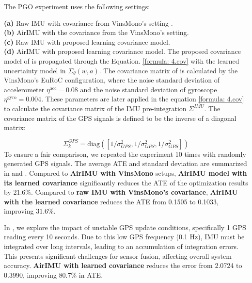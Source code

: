 The PGO experiment uses the following settings:

\noindent\textbf{(a)} Raw IMU with covariance from VinsMono's setting \cite{qin2018vins}. \label{PGO: a}\\
\textbf{(b)} AirIMU with the covariance from the VinsMono's setting.\label{PGO: b}\\
\textbf{(c)} Raw IMU with proposed learning covariance model.\label{PGO: c}\\
\textbf{(d)} AirIMU with proposed learning covariance model.\label{PGO: d}
The proposed covariance model of \textbf{{}} is propagated through the Equation. \ref{formula: 4.cov} with the learned uncertainty model in $\Sigma_\theta(w,a)$. 
The covariance matrix of \textbf{{}} is calculated by the VinsMono's EuRoC configuration, where the noise standard deviation of accelerometer $\eta^{\text{acc}} = 0.08$ and the noise standard deviation of gyroscope $\eta^{\text{gyro}} = 0.004$.
These parameters are later applied in the equation \ref{formula: 4.cov} to calculate the covariance matrix of the IMU pre-integration $\Sigma^{IMU}$.
The covariance matrix of the GPS signals is defined to be the inverse of a diagonal matrix: 

$$\Sigma_k^{GPS} = \mathrm{diag}([1/\sigma^2_{GPS}, 1/\sigma^2_{GPS}, 1/\sigma^2_{GPS}])$$
To ensure a fair comparison, we repeated the experiment 10 times with randomly generated GPS signals.
The average ATE and standard deviation are summarized in  and .
Compared to \textbf{{} AirIMU with VinsMono}  setups, \textbf{{} AirIMU model with its learned covariance} significantly reduces the ATE of the optimization results by 21.6\%. 
Compared to \textbf{ raw IMU with VinsMono's covariance}, \textbf{ AirIMU with the learned covariance} reduces the ATE from 0.1505 to 0.1033, improving 31.6$\%$.

In , we explore the impact of unstable GPS update conditions, specifically 1 GPS reading every 10 seconds. 
Due to this low GPS frequency (0.1 Hz), IMU must be integrated over long intervals, leading to an accumulation of integration errors. 
This presents significant challenges for sensor fusion, affecting overall system accuracy.
\textbf{ AirIMU with learned covariance} reduces the error from 2.0724 to 0.3990, improving 80.7\% in ATE.



